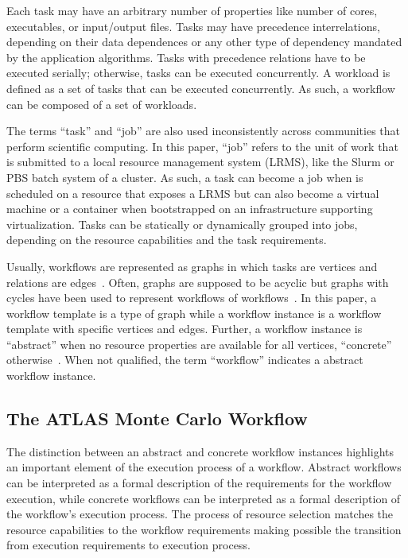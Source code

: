 Each task may have an arbitrary number of properties like number of cores,
executables, or input/output files. Tasks may have precedence interrelations,
depending on their data dependences or any other type of dependency mandated
by the application algorithms. Tasks with precedence relations have to be
executed serially; otherwise, tasks can be executed concurrently. A workload is
defined as a set of tasks that can be executed concurrently. As such, a
workflow can be composed of a set of workloads.

The terms ``task'' and ``job'' are also used inconsistently across communities
that perform scientific computing. In this paper, ``job'' refers to the unit of
work that is submitted to a local resource management system (LRMS), like the
Slurm or PBS batch system of a cluster. As such, a task can become a job when
is scheduled on a resource that exposes a LRMS but can also become a virtual
machine or a container when bootstrapped on an infrastructure supporting
virtualization. Tasks can be statically or dynamically grouped into jobs,
depending on the resource capabilities and the task requirements.

Usually, workflows are represented as graphs in which tasks are vertices and
relations are edges~\cite{}. Often, graphs are supposed to be acyclic but graphs
with cycles have been used to represent workflows of workflows~\cite{}. In this
paper, a workflow template is a type of graph while a workflow instance is a
workflow template with specific vertices and edges. Further, a workflow instance
is ``abstract'' when no resource properties are available for all vertices,
``concrete'' otherwise~\cite{}. When not qualified, the term ``workflow''
indicates a abstract workflow instance.

\subsection{The ATLAS Monte Carlo Workflow}

The distinction between an abstract and concrete workflow instances highlights
an important element of the execution process of a workflow. Abstract workflows
can be interpreted as a formal description of the requirements for the workflow
execution, while concrete workflows can be interpreted as a formal description of the workflow's execution process. The process of resource selection matches the resource capabilities to the workflow requirements making possible the transition from execution requirements to execution process.

